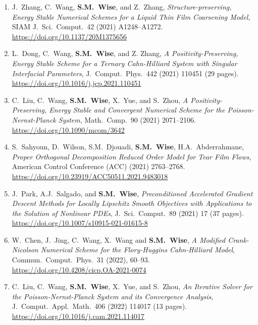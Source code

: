 \documentclass[10pt,letterpaper]{article}
\begin{document}
\begin{enumerate}
	\item
J.~Zhang, C.~Wang, \textbf{S.M.~Wise}, and Z.~Zhang, {\sl Structure-preserving, Energy Stable Numerical Schemes for a Liquid Thin Film Coarsening Model}, SIAM J.~Sci.~Comput.~42 (2021) A1248--A1272.
	\\ 
\url{https://doi.org/10.1137/20M1375656}

	\item
L.~Dong, C.~Wang, \textbf{S.M.~Wise}, and Z. Zhang, {\sl A Positivity-Preserving, Energy Stable Scheme for a Ternary Cahn-Hilliard System with Singular Interfacial Parameters}, J.~Comput.~Phys.~442 (2021) 110451 (29 pages).
	\\ 
\url{https://doi.org/10.1016/j.jcp.2021.110451}

	\item
C.~Liu, C.~Wang, \textbf{S.M.~Wise}, X.~Yue, and S.~Zhou, {\sl A Positivity-Preserving, Energy Stable and Convergent Numerical Scheme for the Poisson-Nernst-Planck System}, Math.~Comp.~90 (2021) 2071--2106.
	\\ 
\url{https://doi.org/10.1090/mcom/3642}

	\item
S.~Sahyoun, D.~Wilson, S.M.~Djouadi, \textbf{S.M.~Wise}, H.A.~Abderrahmane, {\sl Proper Orthogonal Decomposition Reduced Order Model for Tear Film Flows}, American Control Conference (ACC) (2021) 2763--2768.
	\\
\url{https://doi.org/10.23919/ACC50511.2021.9483018}

	\item
J.~Park, A.J.~Salgado, and \textbf{S.M.~Wise}, {\sl Preconditioned Accelerated Gradient Descent Methods for Locally Lipschitz Smooth Objectives with Applications to the Solution of Nonlinear PDEs}, J.~Sci.~Comput.~89 (2021) 17 (37 pages).
	\\ 
\url{https://doi.org/10.1007/s10915-021-01615-8}

	\item
W.~Chen, J.~Jing, C.~Wang, X.~Wang and \textbf{S.M.~Wise}, {\sl A Modified Crank-Nicolson Numerical Scheme for the Flory-Huggins Cahn-Hilliard Model}, Commun.~Comput.~Phys.~31 (2022), 60--93.
	\\ 
\url{https://doi.org/10.4208/cicp.OA-2021-0074}

	\item
C.~Liu, C.~Wang, \textbf{S.M.~Wise}, X.~Yue, and S.~Zhou, {\sl An Iterative Solver for the Poisson-Nernst-Planck System and its Convergence Analysis}, J.~Comput.~Appl.~Math.~406 (2022) 114017 (13 pages).
	\\ 
\url{https://doi.org/10.1016/j.cam.2021.114017}


\end{enumerate}
\end{document}
